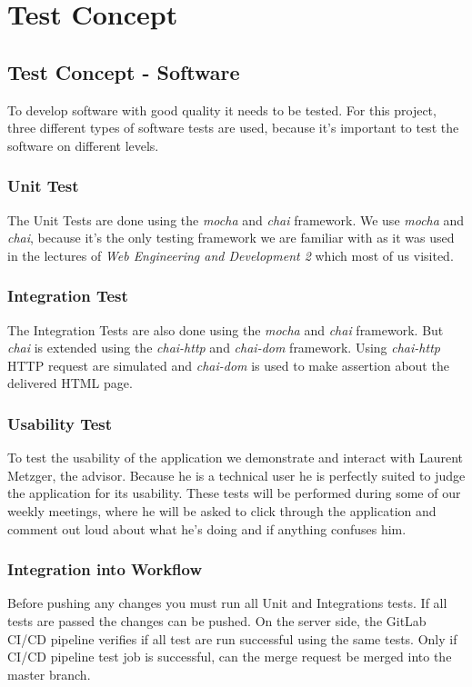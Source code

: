 \chapter{Test Concept}

\section{Test Concept - Software}
To develop software with good quality it needs to be tested.
For this project, three different types of software tests are used, because it's important to test the software on different levels.

\subsection{Unit Test}
The Unit Tests are done using the \textit{mocha} and \textit{chai} framework. We use \textit{mocha} and \textit{chai}, because it's the only testing framework we are familiar with as it was used in the lectures of \textit{Web Engineering and Development 2} which most of us visited.

\subsection{Integration Test}
The Integration Tests are also done using the \textit{mocha} and \textit{chai} framework.
But \textit{chai} is extended using the \textit{chai-http} and \textit{chai-dom} framework.
Using \textit{chai-http} HTTP request are simulated and \textit{chai-dom} is used to make assertion about the delivered HTML page.

\subsection{Usability Test}
To test the usability of the application we demonstrate and interact with Laurent Metzger, the advisor.
Because he is a technical user he is perfectly suited to judge the application for its usability.
These tests will be performed during some of our weekly meetings, where he will be asked to click through the application
and comment out loud about what he's doing and if anything confuses him.

\subsection{Integration into Workflow}
Before pushing any changes you must run all Unit and Integrations tests.
If all tests are passed the changes can be pushed.
On the server side, the GitLab CI/CD pipeline verifies if all test are run successful using the same tests.
Only if CI/CD pipeline test job is successful, can the merge request be merged into the master branch.

